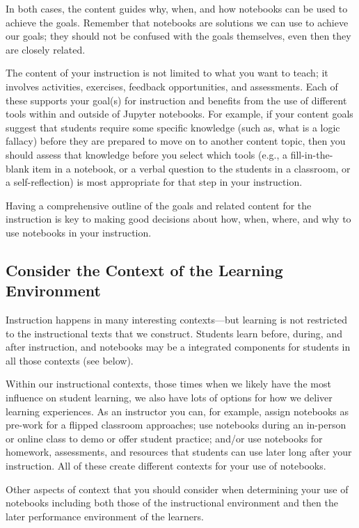 \documentclass[]{book}
\begin{document}
In both cases, the content guides why, when, and how notebooks can be used to
achieve the goals. Remember that notebooks are solutions we can use to achieve
our goals; they should not be confused with the goals themselves, even then they
are closely related.

The content of your instruction is not limited to what you want to teach; it
involves activities, exercises, feedback opportunities, and assessments. Each of
these supports your goal(s) for instruction and benefits from the use of
different tools within and outside of Jupyter notebooks. For example, if your
content goals suggest that students require some specific knowledge (such as,
what is a logic fallacy) before they are prepared to move on to another content
topic, then you should assess that knowledge before you select which tools
(e.g., a fill-in-the-blank item in a notebook, or a verbal question to the
students in a classroom, or a self-reflection) is most appropriate for that step
in your instruction.

Having a comprehensive outline of the goals and related content for the
instruction is key to making good decisions about how, when, where, and why to
use notebooks in your instruction.

\hypertarget{consider-the-context-of-the-learning-environment}{%
\subsection{Consider the Context of the Learning Environment}\label{consider-the-context-of-the-learning-environment}}

Instruction happens in many interesting contexts---but learning is not restricted
to the instructional texts that we construct. Students learn before, during, and
after instruction, and notebooks may be a integrated components for students in
all those contexts (see below).

Within our instructional contexts, those times when we likely have the most
influence on student learning, we also have lots of options for how we deliver
learning experiences. As an instructor you can, for example, assign notebooks as
pre-work for a flipped classroom approaches; use notebooks
during an in-person or online class to demo or offer student practice; and/or
use notebooks for homework, assessments, and resources that students can
use later long after your instruction. All of these create different contexts
for your use of notebooks.

Other aspects of context that you should consider when determining your use of
notebooks including both those of the instructional environment and then the
later performance environment of the learners.
\end{document}
